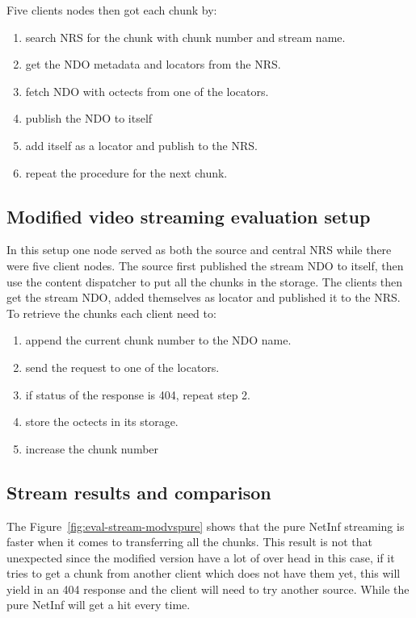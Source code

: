 Five clients nodes then got each chunk by:
\begin{enumerate}
\item search NRS for the chunk with chunk number and stream name.
\item get the NDO metadata and locators from the NRS.
\item fetch NDO with octects from one of the locators.
\item publish the NDO to itself 
\item add itself as a locator and publish to the NRS.
\item repeat the procedure for the next chunk.
\end{enumerate}

\subsection{Modified video streaming evaluation setup}
In this setup one node served as both the source and central NRS while there were five client nodes. The source first published the stream NDO to itself, then use the content dispatcher to put all the chunks in the storage.
The clients then get the stream NDO, added themselves as locator and published it to the NRS. To retrieve the chunks each client need to:
\begin{enumerate}
\item append the current chunk number to the NDO name.
\item send the request to one of the locators.
\item if status of the response is 404, repeat step 2.
\item store the octects in its storage.
\item increase the chunk number
\end{enumerate}

\subsection{Stream results and comparison} 
The Figure~\ref{fig:eval-stream-modvspure} shows that the pure NetInf streaming is faster when it comes to transferring all the chunks. This result is not that unexpected since the modified version have a lot of over head in this case, if it tries to get a chunk from another client which does not have them yet, this will yield in an 404 response and the client will need to try another source. While the pure NetInf will get a hit every time. 
 
